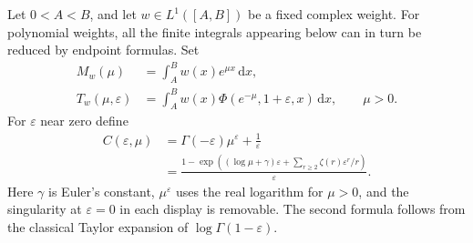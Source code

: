 \documentclass[11pt,letterpaper]{article}
\numberwithin{equation}{section}
\theoremstyle{definition}
\theoremstyle{remark}\newtheorem{remark}[theorem]{Remark}
\newcommand{\dd}{\,\mathrm d}
\begin{document}
Let $0<A<B$, and let $w\in L^1([A,B])$ be a fixed complex weight.
For polynomial weights, all the finite integrals appearing below can
in turn be reduced by endpoint formulas. Set
\begin{align}
 M_w(\mu)&=\int_A^B w(x)e^{\mu x}\dd x,\label{pls:eq:Mw}\\
 T_w(\mu,\varepsilon)&=\int_A^B
           w(x)\Phi(e^{-\mu},1+\varepsilon,x)\dd x,
              \qquad \mu>0.\label{pls:eq:Twmu}
\end{align}
For $\varepsilon$ near zero define
\begin{align}
 C(\varepsilon,\mu)
 &=\Gamma(-\varepsilon)\mu^\varepsilon+\frac1\varepsilon
                    \label{pls:eq:compensator}\\
 &=\frac{1-\exp\left((\log\mu+\gamma)\varepsilon
                 +\sum_{r\ge2}\zeta(r)\varepsilon^r/r\right)}
                 {\varepsilon}.
                    \label{pls:eq:Cexp}
\end{align}
Here $\gamma$ is Euler's constant, $\mu^\varepsilon$ uses the real
logarithm for $\mu>0$, and the singularity at $\varepsilon=0$ in
each display is removable. The second formula follows from the
classical Taylor expansion of $\log\Gamma(1-\varepsilon)$.
\end{document}
